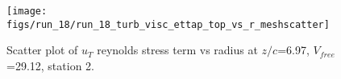 \begin{figure}[H]
\centering
\texttt{[image: figs/run\_18/run\_18\_turb\_visc\_ettap\_top\_vs\_r\_meshscatter]}
\caption{Scatter plot of $
u_T$ reynolds stress term vs radius at $z/c$=6.97, $V_{free}$=29.12, station 2.}
\label{fig:run_18_turb_visc_ettap_top_vs_r_meshscatter}
\end{figure}


